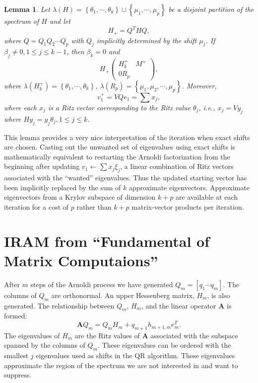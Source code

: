 \documentclass[12pt]{article}
\newcommand{\A}{\mathbf{A}}
\newtheorem{lem}{Lemma}
\begin{document}
\begin{lem}
    Let $\lambda(H) = \left\{\theta_1,\cdots,\theta_k\right\}\cup\left\{\mu_1, \cdots, \mu_p\right\}$ be a disjoint partition of the spectrum of $H$ and let
    \begin{equation}
        H_+ = Q^THQ,
        \label{}
    \end{equation}
    where $Q = Q_1Q_2\cdots Q_p$ with $Q_j$ implicitly determined by the shift $\mu_j$.  If $\beta_j\neq 0, 1 \leq j \leq k-1$, then $\beta_k = 0$ and
    \begin{equation}
        H_+ \begin{pmatrix}
            H_k^+ & M^+ \\
            0 R_p
        \end{pmatrix},
        \label{}
    \end{equation}
    where $\lambda\left(H_k^+\right) = \left\{\theta_1,\cdots,\theta_k\right\}$, $\lambda\left(R_p\right) = \left\{\mu_1, \mu_2,\cdots, \mu_p\right\}$. Moreover,
    \begin{equation}
        v_1^+ = VQe_1 = \sum x_j,
        \label{}
    \end{equation}
    where each $x_j$ is a Ritz vector corresponding to the Ritz value $\theta_j$, i.e., $x_j = Vy_j$ where $Hy_j = y_j\theta_j, 1 \leq j \leq k$.
\end{lem}

This lemma provides a very nice interpretation of the iteration when exact shifts are chosen.  Casting out the unwanted set of eigenvalues using exact shifts is mathematically equivalent to restarting the Arnoldi factorization from the beginning after updating $v_1 \leftarrow \sum x_j\xi_j$, a linear combination of Ritz vectors associated with the ``wanted'' eigenvalues.  Thus the updated starting vector has been implicitly replaced by the sum of $k$ approximate eigenvectors.  Approximate eigenvectors from a Krylov subspace of dimension $k+p$ are available at each iteration for a cost of $p$ rather than $k+p$ matrix-vector products per iteration.


\section{IRAM from ``Fundamental of Matrix Computaions''}
After $m$ steps of the Arnoldi process we have generated $Q_m = \left[q_1 \cdots q_m\right]$.  The columns of $Q_m$ are orthonormal.  An upper Hessenberg matrix, $H_m$, is also generated.  The relationship between $Q_m$, $H_m$, and the linear operator $\A$ is formed:
\begin{equation}
    \A Q_m = Q_mH_m + q_{m+1}h_{m+1,m}e_m^T.
    \label{eq:start}
\end{equation}
The eigenvalues of $H_m$ are the Ritz values of $\A$ associated with the subspace spanned by the columns of $Q_m$.  These eigenvalues can be ordered with the smallest $j$ eigenvalues used as shifts in the QR algorithm.  These eigenvalues approximate the region of the spectrum we are not interested in and want to suppress.
\end{document}
